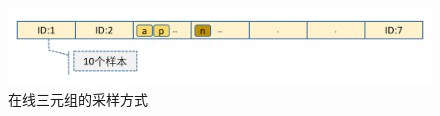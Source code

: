 \begin{figure}[h]
  \centering
  \includegraphics[width=1.0\linewidth]{Img/triplet.png}
  \caption{在线三元组的采样方式}
  \label{fig:triplet}
\end{figure}
